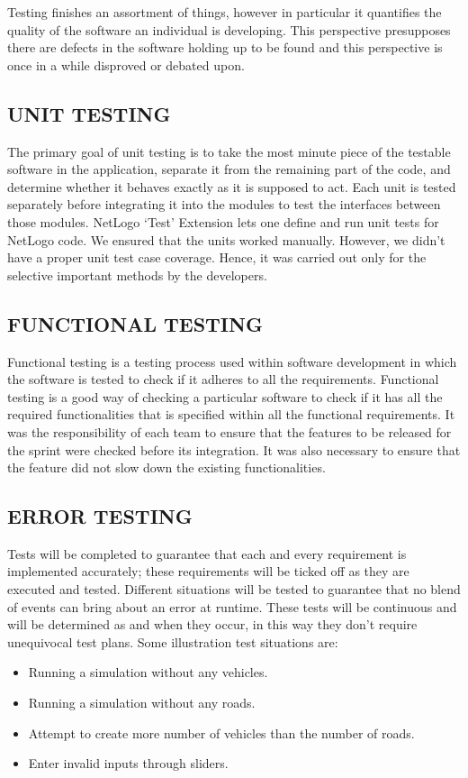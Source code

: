 \documentclass[11pt,a4paper]{article}
\begin{document}
Testing finishes an assortment of things, however in particular it quantifies the quality of the software an individual is developing. This perspective presupposes there are defects in the software holding up to be found and this perspective is once in a while disproved or debated upon.
\subsection{UNIT TESTING}

The primary goal of unit testing is to take the most minute piece of the testable software in the application, separate it from the remaining part of the code, and determine whether it behaves exactly as it is supposed to act. Each unit is tested separately before integrating it into the modules to test the interfaces between those modules. NetLogo ‘Test’ Extension lets one define and run unit tests for NetLogo code.\newline 
We ensured that the units worked manually. However, we didn’t have a proper unit test case coverage. Hence, it was carried out only for the selective important methods by the developers.

\subsection{FUNCTIONAL TESTING}

Functional testing is a testing process used within software development in which the software is tested to check if  it adheres to all the requirements. Functional testing is a good way of checking a particular software to check if it has all the required functionalities that is specified within all the functional requirements.\newline 
It was the responsibility of each team to ensure that the features to be released for the sprint were checked before its integration. It was also necessary to ensure that the feature did not slow down the existing functionalities.

\subsection{ERROR TESTING}

Tests will be completed to guarantee that each and every requirement is implemented accurately; these requirements will be ticked off as they are executed and tested. Different situations will be tested to guarantee that no blend of events can bring about an error at runtime. These tests will be continuous and will be determined as and when they occur, in this way they don't require unequivocal test plans. Some illustration test situations are:
\begin{itemize}
\item Running a simulation without any vehicles.
\item Running a simulation without any roads.
\item Attempt to create more number of vehicles than the number of roads.
\item Enter invalid inputs through sliders.
\end{itemize}
\end{document}
